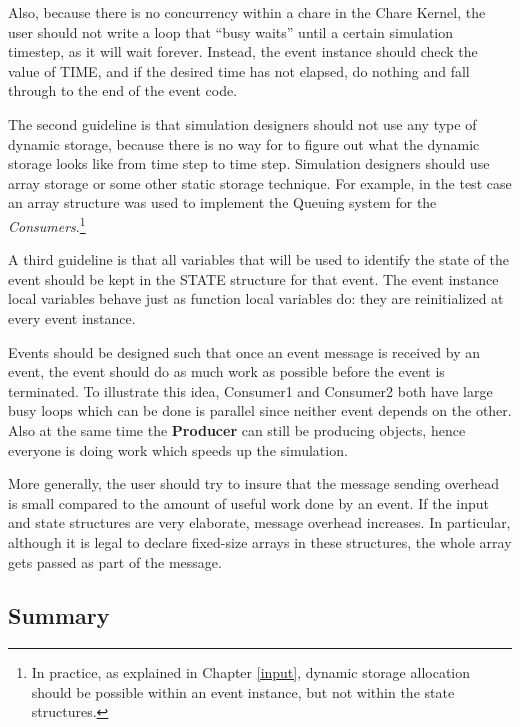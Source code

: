 Also, because there is no concurrency within a chare in the Chare
Kernel, the user should not write a loop that ``busy waits'' until a
certain simulation timestep, as it will wait forever.  Instead, the
event instance should check  the value of TIME, and if the desired time
has not elapsed, do nothing and fall through to the end of the event code.
 
The second guideline is that simulation designers should not use any
type of dynamic storage, because there is no way for \dispare to
figure out what the dynamic storage looks like from time step to
time step. Simulation designers should use array storage or some
other static storage technique. For example, in the test case an
array structure was used to implement the Queuing system for the 
{\em Consumers}.\footnote{In practice, as explained in Chapter
\ref{input}, dynamic storage allocation should be possible within an
event instance, but not within the state structures.}
 
A third guideline is that all variables that will be used to 
identify the state of the event should be kept in the STATE
structure for that event.  The event instance local variables behave
just as function local variables do: they are reinitialized at every
event instance.
 
Events should be designed such that once an
event message is received by an event,  the event should do as
much work as possible before the event is terminated.
To illustrate this idea, Consumer1 and Consumer2 both have
large busy loops which can be done is parallel since neither event
 depends on the other. Also at the same time the 
{\bf Producer} can still be producing objects, hence everyone is doing 
work which speeds up the simulation.

More generally, the user should try to insure that the message sending
overhead is small compared to the amount of useful work done by an
event.  If the input and state structures are very elaborate, message
overhead increases.  In particular, although it is legal to declare
fixed-size arrays in these structures, the whole array gets passed as
part of the message.  

\subsection{Summary}

